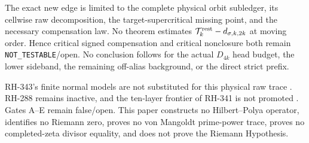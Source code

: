 \documentclass[11pt]{article}
\theoremstyle{remark}
\newcommand{\cT}{\mathcal T}
\begin{document}
The exact new edge is limited to the complete physical orbit subledger, its
cellwise raw decomposition, the target-supercritical missing point, and the
necessary compensation law.  No theorem estimates
$\cT_k^{\rm rest}-d_{\sigma,k,2k}$ at moving order.  Hence critical signed
compensation and critical nonclosure both remain \texttt{NOT\_TESTABLE}/open.
No conclusion follows for the actual $D_{4k}$ head budget, the lower
sideband, the remaining off-alias background, or the direct strict prefix.

RH-343's finite normal models are not substituted for this physical raw
trace \citep{WangEqualInvariant2026}.  RH-288 remains inactive, and the
ten-layer frontier of RH-341 is not promoted \citep{WangActualFrontier2026}.
Gates A--E remain false/open.  This paper constructs no Hilbert--Polya
operator, identifies no Riemann zero, proves no von Mangoldt prime-power
trace, proves no completed-zeta divisor equality, and does not prove the
Riemann Hypothesis.



\end{document}
